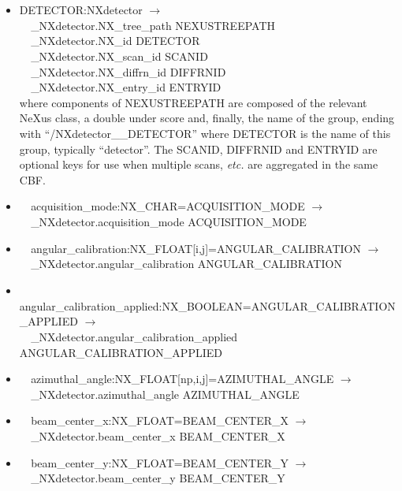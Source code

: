 \documentclass[11pt]{article}
\begin{document}
{{\begin{itemize}

\item{DETECTOR:NXdetector $\rightarrow$\\
\verb|  |\_NXdetector.NX\_tree\_path    NEXUSTREEPATH \\
\verb|  |\_NXdetector.NX\_id            DETECTOR\\
\verb|  |\_NXdetector.NX\_scan\_id      SCANID \\
\verb|  |\_NXdetector.NX\_diffrn\_id    DIFFRNID \\
\verb|  |\_NXdetector.NX\_entry\_id     ENTRYID \\
where components of NEXUSTREEPATH are composed of the
relevant NeXus class, a double under score and, finally, the
name of the group, ending with ``/NXdetector\_\_DETECTOR''
where DETECTOR is the name of this group, typically ``detector''.
The SCANID, DIFFRNID and ENTRYID are optional keys for use
when multiple scans, {\it etc.} are aggregated in the same CBF.}

\item{\verb|  |acquisition\_mode:NX\_CHAR=ACQUISITION\_MODE $\rightarrow$\\
\verb|  |\_NXdetector.acquisition\_mode ACQUISITION\_MODE}

\item{\verb|  |angular\_calibration:NX\_FLOAT[i,j]=ANGULAR\_CALIBRATION $\rightarrow$\\
\verb|  |\_NXdetector.angular\_calibration ANGULAR\_CALIBRATION}

\item{\verb|  |angular\_calibration\_applied:NX\_BOOLEAN=ANGULAR\_CALIBRATION\_APPLIED $\rightarrow$\\
\verb|  |\_NXdetector.angular\_calibration\_applied ANGULAR\_CALIBRATION\_APPLIED}

\item{\verb|  |azimuthal\_angle:NX\_FLOAT[np,i,j]=AZIMUTHAL\_ANGLE $\rightarrow$\\
\verb|  |\_NXdetector.azimuthal\_angle AZIMUTHAL\_ANGLE}

\item{\verb|  |beam\_center\_x:NX\_FLOAT=BEAM\_CENTER\_X $\rightarrow$\\
\verb|  |\_NXdetector.beam\_center\_x BEAM\_CENTER\_X}

\item{\verb|  |beam\_center\_y:NX\_FLOAT=BEAM\_CENTER\_Y $\rightarrow$\\
\verb|  |\_NXdetector.beam\_center\_y BEAM\_CENTER\_Y}


\end{itemize}}}
\end{document}
